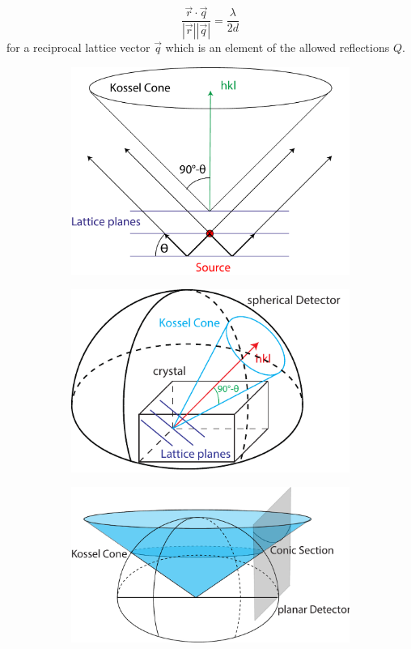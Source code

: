 \begin{equation}
\frac{\vec{r} \cdot \vec{q}}{\left|\vec{r}\right| \left| \vec{q}\right|} = \frac{\lambda}{2d}
\end{equation}
 for a reciprocal lattice vector $\vec{q}$ which is an element of the allowed reflections $Q$. 
\begin{figure}
	\centering
	\begin{subfigure}[b]{0.3\textwidth}
	\includegraphics[width=\linewidth]{images/kossel0.pdf}
	\end{subfigure}
	\begin{subfigure}[b]{0.3\textwidth}
	\includegraphics[width=\linewidth]{images/kossel.pdf}
	\end{subfigure}
	\begin{subfigure}[b]{0.35\textwidth}
	\includegraphics[width=\linewidth]{images/kossel2.pdf}

\end{subfigure}
\end{figure}
